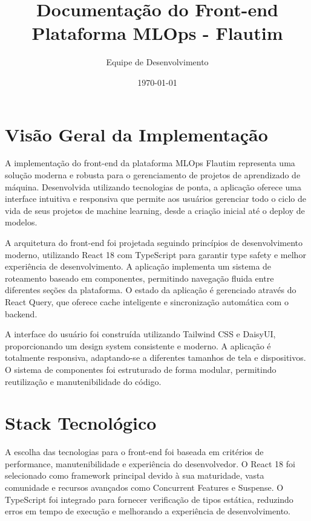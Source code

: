 \documentclass[12pt,a4paper]{article}
\begin{document}
\title{\Huge\textbf{Documentação do Front-end}\\\vspace{0.5cm}\Large Plataforma MLOps - Flautim}
\author{Equipe de Desenvolvimento}
\date{\today}

\maketitle

\tableofcontents
\newpage

\section{Visão Geral da Implementação}

A implementação do front-end da plataforma MLOps Flautim representa uma solução moderna e robusta para o gerenciamento de projetos de aprendizado de máquina. Desenvolvida utilizando tecnologias de ponta, a aplicação oferece uma interface intuitiva e responsiva que permite aos usuários gerenciar todo o ciclo de vida de seus projetos de machine learning, desde a criação inicial até o deploy de modelos.

A arquitetura do front-end foi projetada seguindo princípios de desenvolvimento moderno, utilizando React 18 com TypeScript para garantir type safety e melhor experiência de desenvolvimento. A aplicação implementa um sistema de roteamento baseado em componentes, permitindo navegação fluida entre diferentes seções da plataforma. O estado da aplicação é gerenciado através do React Query, que oferece cache inteligente e sincronização automática com o backend.

A interface do usuário foi construída utilizando Tailwind CSS e DaisyUI, proporcionando um design system consistente e moderno. A aplicação é totalmente responsiva, adaptando-se a diferentes tamanhos de tela e dispositivos. O sistema de componentes foi estruturado de forma modular, permitindo reutilização e manutenibilidade do código.

\section{Stack Tecnológico}

A escolha das tecnologias para o front-end foi baseada em critérios de performance, manutenibilidade e experiência do desenvolvedor. O React 18 foi selecionado como framework principal devido à sua maturidade, vasta comunidade e recursos avançados como Concurrent Features e Suspense. O TypeScript foi integrado para fornecer verificação de tipos estática, reduzindo erros em tempo de execução e melhorando a experiência de desenvolvimento.
\end{document}
